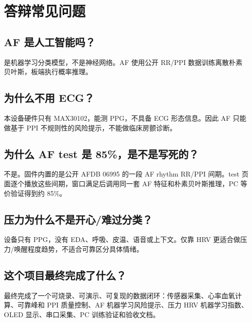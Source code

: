 \documentclass[10.5pt,a4paper,UTF8]{ctexart}
\begin{document}
\section{答辩常见问题}

\subsection{AF 是人工智能吗？}

是机器学习分类模型，不是神经网络。AF 使用公开 RR/PPI 数据训练离散朴素贝叶斯，板端执行概率推理。

\subsection{为什么不用 ECG？}

本设备硬件只有 MAX30102，能测 PPG，不具备 ECG 形态信息。因此 AF 只能做基于 PPI 不规则性的风险提示，不能做临床房颤诊断。

\subsection{为什么 AF test 是 85\%，是不是写死的？}

不是。固件内置的是公开 AFDB 06995 的一段 AF rhythm RR/PPI 间期。test 页面逐个播放这些间期，窗口满足后调用同一套 AF 特征和朴素贝叶斯推理，PC 等价验证得到约 85\%。

\subsection{压力为什么不是开心/难过分类？}

设备只有 PPG，没有 EDA、呼吸、皮温、语音或上下文。仅靠 HRV 更适合做压力/唤醒程度趋势，不适合可靠区分具体情绪。

\subsection{这个项目最终完成了什么？}

最终完成了一个可烧录、可演示、可复现的数据闭环：传感器采集、心率血氧计算、可靠峰和 PPI 质量控制、AF 机器学习风险提示、压力 HRV 机器学习指数、OLED 显示、串口采集、PC 训练验证和验收文档。
\end{document}
